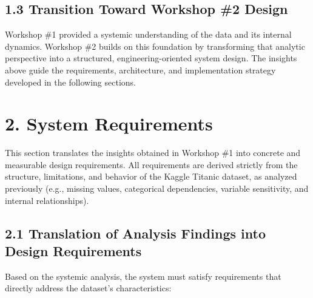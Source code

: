 \documentclass[12pt]{report}
\begin{document}
\subsection*{1.3 Transition Toward Workshop \#2 Design}

Workshop \#1 provided a systemic understanding of the data and its internal dynamics.
Workshop \#2 builds on this foundation by transforming that analytic perspective into a
structured, engineering-oriented system design. The insights above guide the requirements,
architecture, and implementation strategy developed in the following sections.


\section*{2. System Requirements}

This section translates the insights obtained in Workshop \#1 into concrete and measurable design requirements. 
All requirements are derived strictly from the structure, limitations, and behavior of the Kaggle Titanic dataset, 
as analyzed previously (e.g., missing values, categorical dependencies, variable sensitivity, and internal relationships).

\subsection*{2.1 Translation of Analysis Findings into Design Requirements}

Based on the systemic analysis, the system must satisfy requirements that directly address the dataset's characteristics:
\end{document}
